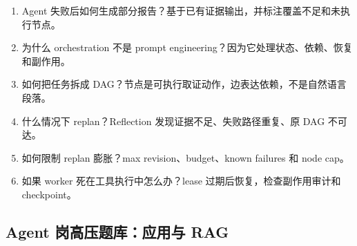 \begin{enumerate}[leftmargin=2em]
  \item Agent 失败后如何生成部分报告？基于已有证据输出，并标注覆盖不足和未执行节点。
  \item 为什么 orchestration 不是 prompt engineering？因为它处理状态、依赖、恢复和副作用。
  \item 如何把任务拆成 DAG？节点是可执行取证动作，边表达依赖，不是自然语言段落。
  \item 什么情况下 replan？Reflection 发现证据不足、失败路径重复、原 DAG 不可达。
  \item 如何限制 replan 膨胀？max revision、budget、known failures 和 node cap。
  \item 如果 worker 死在工具执行中怎么办？lease 过期后恢复，检查副作用审计和 checkpoint。
\end{enumerate}

\subsection{Agent 岗高压题库：应用与 RAG}
